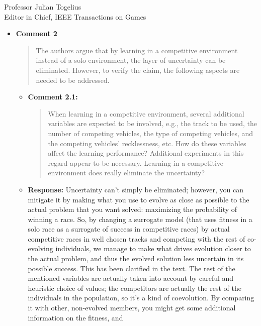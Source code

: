 \documentclass[10pt]{letter} %
\begin{document}
\begin{letter}{Professor Julian Togelius \\ Editor in Chief, IEEE Transactions on Games}
\begin{enumerate}
\begin{itemize}
\item {\bf Comment 2}	
		\begin{quote}
	The authors argue that by learning in a competitive environment instead of a solo environment, the layer of uncertainty can be eliminated. However, to verify the claim, the following aspects are needed to be addressed.
		\end{quote}	
	\begin{itemize}	
		\item {\bf Comment 2.1:}				
		\begin{quote}
When learning in a competitive environment, several additional variables are expected to be involved, e.g., the track to be used, the number of competing vehicles, the type of competing vehicles, and the competing vehicles' recklessness, etc. How do these variables affect the learning performance? Additional experiments in this regard appear to be necessary. Learning in a competitive environment does really eliminate the uncertainty?
			\end{quote}	
			\item {\bf Response:}
			Uncertainty can't simply be eliminated;
                        however, you can mitigate it by making what
                        you use to evolve as close as possible to the
                        actual problem that you want solved:
                        maximizing the probability of winning a
                        race. So, by changing a surrogate model (that
                        uses fitness in a solo race as a surrogate of
                        success in competitive races) by actual
                        competitive races in well chosen tracks and
                        competing with the rest of co-evolving
                        individuals, we manage to make what drives
                        evolution closer to the actual problem, and
                        thus the evolved solution less uncertain in
                        its possible success. This has been clarified
                        in the text. The rest of the mentioned
                        variables are actually taken into account by
                        careful and heuristic choice of values; the
                        competitors are actually the rest of the
                        individuals in the population, so it's a kind
                        of coevolution. By comparing it with other,
                        non-evolved members, you might get some
                        additional information on the fitness, and

\end{itemize}
\end{itemize}
\end{enumerate}
\end{letter}
\end{document}
